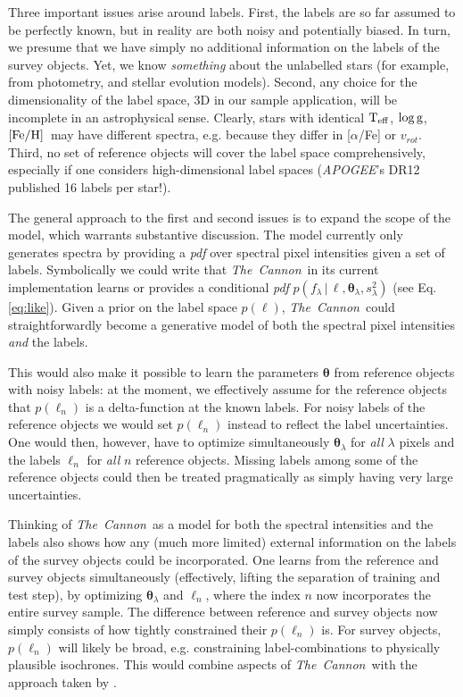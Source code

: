 \documentclass[12pt, preprint]{aastex}
\newcommand{\tc}{\textsl{The~Cannon}}
\newcommand{\apogee}{\textsl{APOGEE}}
\newcommand{\set}[1]{\bm{#1}}
\newcommand{\starlabel}{\ell}
\newcommand{\starlabelvec}{\set{\starlabel}}
\newcommand{\given}{\,|\,}
\newcommand{\teff}{\mbox{$\rm T_{eff}$}}
\newcommand{\feh}{\mbox{$\rm [Fe/H]$}}
\newcommand{\logg}{\mbox{$\rm \log g$}}
\begin{document}
Three important issues arise around labels. First, the labels are so far assumed to be perfectly known, 
but in reality are both noisy and potentially biased. In turn, we presume that we
have simply no additional information on the labels of the survey objects. Yet,
we know \emph{something} about the unlabelled stars (for example, from
photometry, and stellar evolution models). Second, any choice for the dimensionality of the label space, 3D in our sample application, will be incomplete in an astrophysical sense. Clearly, stars with identical \teff, \logg, \feh\ may have different spectra, e.g.
because they differ in [$\alpha$/Fe] or $v_{rot}$.
Third, no set of reference objects will cover the label
space comprehensively, especially if one considers high-dimensional label spaces (\apogee 's DR12
published 16 labels per star!). 

The general approach to the first and second issues is to expand the scope of the model, which warrants substantive discussion. The model currently only generates spectra by providing a \textit{pdf}
over spectral pixel intensities given a set of labels.
Symbolically we could write that \tc\ in its current implementation
learns or provides a conditional \textit{pdf}
$p(f_\lambda\given\starlabelvec,\set{\theta}_\lambda, s_\lambda^2)$ (see Eq.\ref{eq:like}).
Given a prior on the label space
$p(\starlabelvec)$, \tc\ could straightforwardly become a generative model of both
the spectral pixel intensities \emph{and} the labels.

This would also make it possible to learn the parameters $\set{\theta}$ from
reference objects with noisy labels: at the moment, we effectively 
assume for the reference objects that $p(\starlabelvec_n)$ is a delta-function 
at the known labels. For noisy labels of the reference objects 
we would set $p(\starlabelvec_n)$ instead to reflect the label uncertainties. 
One would then, however, have to optimize simultaneously
$\set{\theta}_\lambda$ for \textit{all} $\lambda$ pixels and the labels $\starlabelvec_n$
for \textit{all} $n$ reference objects. Missing labels among some of the reference
objects could then be treated pragmatically as simply having very large uncertainties.

Thinking of \tc\ as a model for both the spectral intensities and the labels
also shows how any (much more limited) external information on the labels of the survey
objects could be incorporated. One learns from the reference and survey objects
simultaneously (effectively, lifting the separation of training and test step),
by optimizing $\set{\theta}_\lambda$ and $\starlabelvec_n$, where the index $n$ now 
incorporates the entire survey sample. The difference between reference and survey objects
now simply consists of how tightly constrained their $p(\starlabelvec_n)$ is. 
For survey objects, $p(\starlabelvec_n)$ will likely be broad, e.g. constraining label-combinations
to physically plausible isochrones. This would combine aspects of \tc\ with the approach
taken by \cite{SB2014}.
\end{document}
